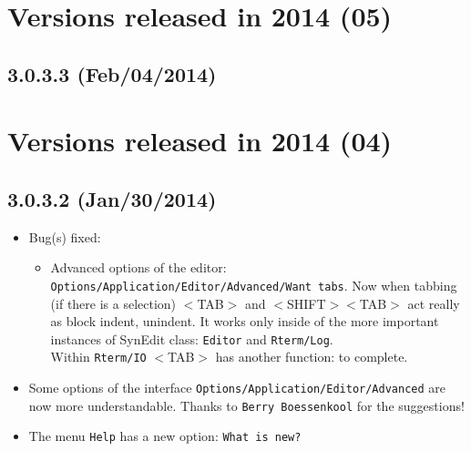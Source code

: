 
\hypertarget{2014}{}
\section{Versions released in 2014 (05)}
\subsection*{3.0.3.3 (Feb/04/2014)}


\section{Versions released in 2014 (04)}
\subsection*{3.0.3.2 (Jan/30/2014)}
\begin{itemize}
  \item Bug(s) fixed:
    \begin{itemize}
      \item Advanced options of the editor: \texttt{Options/Application/Editor/Advanced/Want tabs}.
       Now when tabbing (if there is a selection) $<$TAB$>$ and $<$SHIFT$>$$<$TAB$>$ act really as block indent, unindent.
       It works only inside of the more important instances of SynEdit class: \texttt{Editor} and \texttt{Rterm/Log}. \\
       Within \texttt{Rterm/IO} $<$TAB$>$ has another function: to complete.
    \end{itemize}
  \item Some options of the interface \texttt{Options/Application/Editor/Advanced} are now more understandable.
   Thanks to \texttt{Berry Boessenkool} for the suggestions!
  \item The menu \texttt{Help} has a new option: \texttt{What is new?}
\end{itemize}



